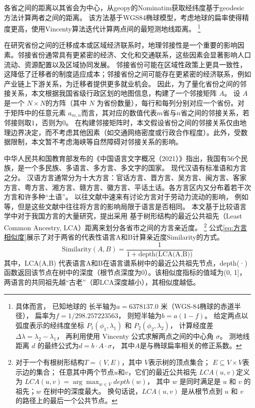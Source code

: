 \documentclass[master, final]{zufe-thesis}
\begin{document}
各省之间的距离以其省会为中心，从geopy的Nominatim获取经纬度基于geodesic方法计算两者之间的距离。
该方法基于WGS84椭球模型，考虑地球的扁率使得精度更高，使用Vincenty算法迭代计算两点间的最短测地线距离。
\footnote{
具体而言，
已知地球的
长半轴为$a = 6378137.0$ 米（WGS-84椭球的赤道半径），
扁率为$f = 1 / 298.257223563$，
则短半轴为$b = a(1 - f)$。
给定两点以弧度表示的经纬度坐标 $ P_1(\phi_1, \lambda_1) $ 和 $ P_2(\phi_2, \lambda_2) $，
计算经度差$\Delta\lambda = \lambda_2 - \lambda_1$，
再利用使用 Vincenty 公式求解两点之间的中心角 $\sigma$。
测地线距离 $d$ 的最终公式为$d = b \cdot A \cdot \sigma$，
其中$A$是与椭球扁率相关的修正系数。
}

在研究省份之间的迁移成本或区域经济联系时，地理邻接性是一个重要的影响因素。邻接省份通常具有更紧密的经济、文化和交通联系，这些因素会显著影响人口流动、资源配置以及区域协同发展。
邻接省份可能在区域性政策上更具一致性，这降低了迁移者的制度适应成本；邻接省份之间可能存在更紧密的经济联系，例如产业链上下游关系，为迁移者提供更多就业机会。
因此，为了量化省份之间的邻接关系，本文根据我国省级行政区划的地图信息，构建了一个邻接矩阵 $A$。
设 $A$ 是一个 $N \times N$的方阵（其中 $N$ 为省份数量），每行和每列分别对应一个省份。对于矩阵中的任意元素 $a_{m,n}$而言，其对应的数值代表$m$省与$n$省之间的邻接关系，若邻接则取$1$，否则为$0$。
在构建邻接矩阵时，本文假设省份之间的邻接关系仅由地理边界决定，而不考虑其他因素（如交通网络密度或行政合作程度）。此外，受数据限制，本文暂不考虑海峡等自然障碍对邻接关系的影响。


中华人民共和国教育部发布的《中国语言文字概况（2021）》指出，我国有56个民族，是一个多民族、多语言、多方言、多文字的国家。
现代汉语有标准语和方言之分。
汉语方言通常分为十大方言：官话方言、晋方言、吴方言、闽方言、客家方言、粤方言、湘方言、赣方言、徽方言、平话土话。各方言区内又分布着若干次方言和许多种“土语”。
以往文献中速来有讨论方言对于劳动力流动的影响，
例如\textcite{HuangZongYeFangYanDuiShengJiRenKouQianYiDeYingXiang2020,LiQinFangYanPuTongHuaYuZhongGuoLaoDongLiQuYuLiuDong2014}等，但是这些文献中往往将方言的影响局限于语言是否相同。
本文基于比较语言学中对于我国方言的大量研究，提出采用
基于树形结构的最近公共祖先（Least Common Ancestry, LCA）距离来划分各省市之间的方言亲近度。
\footnote{
对于一个有根树形结构$T=(V,E)$，其中
$V$表示树的顶点集合；
$E\subseteq V \times V$表示边的集合；
任意其中两个节点$u$和$v$，它们的最近公共祖先 $LCA(u,v) $定义为
$LCA(u,v)=\arg \max_{w\in V} depth(w)$，
其中 $w$ 是同时满足是 $u$ 和 $v$ 的祖先；$w$ 在树中的深度最大。
换句话说，$LCA(u,v)$ 是从根节点到 $u$ 和 $v$ 的路径上的最后一个公共节点。
}
公式\ref{eq:方言相似度}展示了对于两省的代表性语言A和B计算亲近度Similarity的方式。
\begin{equation} 
\label{eq:方言相似度} 
\text{Similarity}(A,B) = \frac{1}{1+\text{depth(LCA(A,B))}} 
\end{equation}
其中，LCA(A,B) 代表语言A和B在语言谱系树中的最近公共祖先节点，depth(·) 函数返回该节点在树中的深度（根节点深度为0）。该相似度指标的值域为(0, 1]，两语言的共同祖先越“古老”（即LCA深度越小），其相似度越低。
\end{document}
